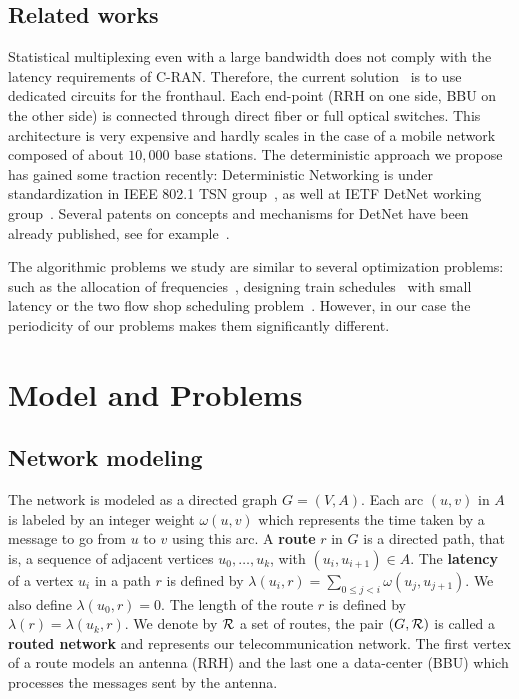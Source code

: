 \documentclass[10pt, conference, letterpaper]{IEEEtran}
\begin{document}
 \subsection*{Related works}

 Statistical multiplexing even with a large bandwidth does not comply with the latency requirements of C-RAN. Therefore, the current solution~\cite{pizzinat2015things,tayq2017real} is to use dedicated circuits for the fronthaul. Each end-point (RRH on one side, BBU on the other side) is connected through direct fiber or full optical switches. This architecture is very expensive and hardly scales in the case of a mobile network composed of about $10,000$ base stations. The deterministic approach we propose has gained some traction recently: Deterministic Networking is under standardization in IEEE 802.1 TSN group~\cite{finn-detnet-architecture-08}, as well at IETF DetNet working group~\cite{ieee802}. Several patents on concepts and mechanisms for DetNet have been already published, see for example~\cite{howe2005time,leclerc2016transmission}. 
     
The algorithmic problems we study are similar to several optimization problems: such as the allocation of frequencies~\cite{borndorfer1998frequency}, designing train schedules~\cite{strotmann2007railway} with small latency or the two flow shop scheduling problem~\cite{yu2004minimizing}. However, in our case the periodicity of our problems makes them significantly different.


\section{Model and Problems}\label{sec:def}

  \subsection{Network modeling}
  

The network is modeled as a directed graph $G=(V,A)$. Each arc  $(u,v)$ in $A$ is labeled by an integer weight $\omega(u,v)$ which represents the time taken by a message to go from $u$ to $v$ using this arc. A {\bf route} $r$ in $G$ is a directed path, that is, a sequence of adjacent vertices $u_0, \ldots , u_{k}$, with $(u_i,u_{i+1}) \in A$.  The {\bf latency} of a vertex $u_i$ in a path $r$ is defined by $\lambda(u_i,r)= \sum\limits_{0 \leq j <i} \omega(u_j, u_{j+1})$. We also define $\lambda(u_0,r)=0$. The length of the route $r$ is defined by $\lambda (r)= \lambda (u_k,r)$.
We denote by $\cal R$ a set of routes, the pair $(G,\cal R)$ is called a {\bf routed network} and represents our telecommunication network.
The first vertex of a route models an antenna (RRH) and the last one a data-center (BBU) which processes the messages sent by the antenna.
\end{document}
